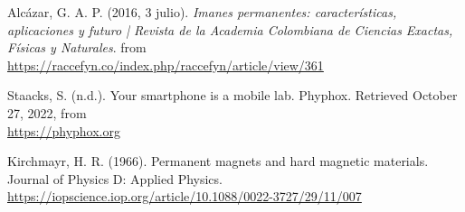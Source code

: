\begin{thebibliography}{}


 Alcázar, G. A. P. (2016, 3 julio). \textit{ Imanes permanentes: características, aplicaciones y futuro | Revista de la Academia Colombiana de Ciencias Exactas, Físicas y Naturales}.  from \\
\hyperlink{https://raccefyn.co/index.php/raccefyn/article/view/361}{https://raccefyn.co/index.php/raccefyn/article/view/361}

 Staacks, S. (n.d.). Your smartphone is a mobile lab. Phyphox. Retrieved October 27, 2022, from \\
\hyperlink{https://phyphox.org}{https://phyphox.org}

 Kirchmayr, H. R. (1966). Permanent magnets and hard magnetic materials. Journal of Physics D: Applied Physics. 
\hyperlink{https://iopscience.iop.org/article/10.1088/0022-3727/29/11/007}{https://iopscience.iop.org/article/10.1088/0022-3727/29/11/007}










\end{thebibliography}